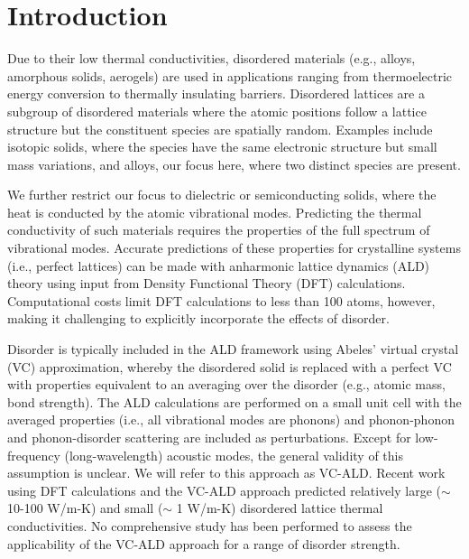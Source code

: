 \documentclass[aps,prb,onecolumn,preprint,footinbib,superscriptaddress,amsmath,amssymb,floatfix]{revtex4}
\begin{document}
\section{\label{S:Introduction}Introduction}

Due to their low thermal conductivities, 
disordered materials (e.g., alloys, amorphous solids, aerogels) 
are used in 
applications ranging from thermoelectric energy conversion to 
thermally insulating barriers.
\cite{cahill_lattice_1988,minnich_bulk_2009,chen_recent_2003,
snyder_complex_2008,toberer_phonon_2011,zebarjadi_perspectives_2012} 
Disordered lattices are a subgroup of disordered materials where 
the atomic positions follow a lattice structure but the 
constituent species are spatially random. Examples include isotopic 
solids, where the species have the same electronic structure but 
small mass variations,\cite{tamura_isotope_1983,lindsay_thermal_2012} 
and alloys, our focus here, where two distinct 
species are present.\cite{abeles_thermal_1962,abeles_lattice_1963}

We further restrict our focus to dielectric or semiconducting solids,  
where the heat is conducted by the atomic vibrational modes. 
Predicting the thermal conductivity of such materials 
requires the properties of the full spectrum of vibrational modes.
\cite{ziman_electrons_2001,feldman_thermal_1993,allen_diffusons_1999} 
Accurate predictions of these properties for 
crystalline systems (i.e., perfect lattices)  
can be made with anharmonic lattice dynamics (ALD) theory 
using input from Density Functional Theory (DFT)  
calculations.\cite{ward_intrinsic_2010,lindsay_thermal_2012,
garg_role_2011,
shiga_microscopic_2012,tian_phonon_2012,
shiomi_thermal_2011,esfarjani_heat_2011,
li_thermal_2012,luckyanova_coherent_2012}
Computational costs limit DFT calculations to less than 100 atoms, 
however, making it challenging to explicitly incorporate the effects 
of disorder.
\cite{koker_thermal_2009,bao_first-principles_2012,sosso_thermal_2012,
lindsay_thermal_2012,tian_phonon_2012,garg_role_2011}

Disorder is typically included in the ALD framework using Abeles' 
virtual crystal (VC) approximation, whereby the disordered  
solid is replaced with a perfect VC with properties 
equivalent to an averaging over the disorder 
(e.g., atomic mass, bond strength).\cite{abeles_lattice_1963}
The ALD calculations are performed on a small 
unit cell with the averaged properties 
(i.e., all vibrational modes are phonons) and 
phonon-phonon and phonon-disorder scattering 
are included as perturbations.
\cite{abeles_lattice_1963,tamura_isotope_1983,
tian_phonon_2012,lindsay_thermal_2012} 
Except for low-frequency (long-wavelength) acoustic modes,
the general validity of this assumption is unclear. 
We will refer to this approach as VC-ALD. 
Recent work using DFT calculations and the VC-ALD approach 
predicted relatively large ($\sim$ 10-100 W/m-K)
\cite{garg_role_2011,lindsay_thermal_2012,li_thermal_2012} and 
small ($\sim$ 1 W/m-K)\cite{tian_phonon_2012} 
disordered lattice thermal conductivities. No comprehensive study has 
been performed to assess the applicability of the VC-ALD approach for a 
range of disorder strength.
\end{document}
